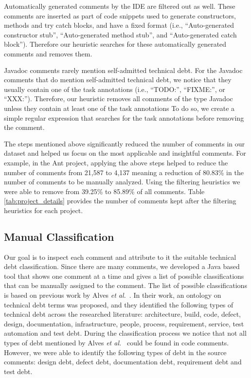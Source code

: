 Automatically generated comments by the IDE are filtered out as well. These comments are inserted as part of code snippets used to generate constructors, methods and try catch blocks, and have a fixed format (i.e., ``Auto-generated constructor stub'', ``Auto-generated method stub'', and ``Auto-generated catch block''). Therefore our heuristic searches for these automatically generated comments and removes them. 

Javadoc comments rarely mention self-admitted technical debt. For the Javadoc comments that do mention self-admitted technical debt, we notice that they usually contain one of the task annotations (i.e., ``TODO:'', ``FIXME:'', or ``XXX:''). Therefore, our heuristic removes all comments of the type Javadoc unless they contain at least one of the task annotations  To do so, we create a simple regular expression that searches for the task annotations before removing the comment.  

The steps mentioned above significantly reduced the number of comments in our dataset and helped us focus on the most applicable and insightful comments. For example, in the Ant project, applying the above steps helped to reduce the number of comments from 21,587 to 4,137 meaning a reduction of 80.83\% in the number of comments to be manually analyzed. Using the filtering heuristics we were able to remove from 39.25\% to 85.89\% of all comments. Table \ref{tab:project_details} provides the number of comments kept after the filtering heuristics for each project.


\subsection{Manual Classification} %
\label{sub:manual_classification}

Our goal is to inspect each comment and attribute to it the suitable technical debt classification. Since there are many comments, we developed a Java based tool that shows one comment at a time and gives a list of possible classifications that can be manually assigned to the comment. The list of possible classifications is based on previous work by Alves \textit{et al.}~\cite{Alves2014MTD}. In their work, an ontology on technical debt terms was proposed, and they identified the following types of technical debt across the researched literature: architecture, build, code, defect, design, documentation, infrastructure, people, process, requirement, service, test automation and test debt. During the classification process we notice that not all types of debt mentioned by Alves \emph{et al.}~\cite{Alves2014MTD} could be found in code comments. However, we were able to identify the following types of debt in the source comments: design debt, defect debt, documentation debt, requirement debt and test debt. 

